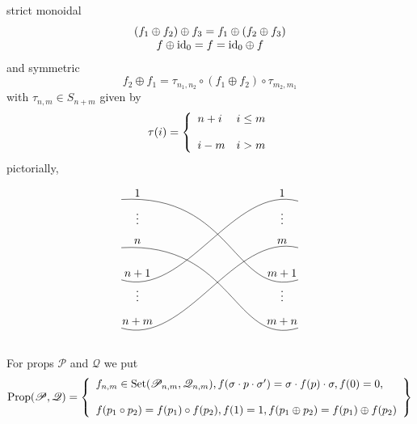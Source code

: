 \documentclass[leqno]{article}
\newcommand{\biop}{\mathscr{P}}
\DeclareMathOperator{\prop}{Prop}
\numberwithin{equation}{section}
\begin{document}
strict monoidal 
\begin{equation}
				\begin{array}[H]{c}
				(f_1\oplus f_2)\oplus f_3 = f_1\oplus (f_2\oplus f_3) \\
				f\oplus \text{id}_0=f = \text{id}_0\oplus f
				\end{array}
				\label{eq:10.7}
\end{equation}
and symmetric 
\begin{equation}
				f_2\oplus f_1 = \tau_{n_1,n_2}\circ (f_1\oplus f_2)\circ \tau_{m_2,m_1}
				\label{eq:10.8}
\end{equation}
with $\tau_{n,m}\in S_{n+m}$ given by
\begin{equation}
				\tau(i)=\left\{ 
								\begin{array}[H]{lc}
												n+i & i\le m \\\\
												i-m & i>m
								\end{array}
				\right.
				\label{eq:10.9}
\end{equation}
pictorially, 
\begin{equation}
				\begin{aligned}
\begin{tikzpicture}[baseline=0mm]
				\node at (5mm,5mm) {$n+m$};
				\node at (5mm,20mm) {$n+1$};
				\node at (5mm,30mm) {$n$};
				\node at (5mm,45mm) {$1$};
				\node at (5mm,38mm) {$\vdots$};
				\node at (5mm,14mm) {$\vdots$};

				\node at (50mm,5mm) {$m+n$};
				\node at (50mm,20mm) {$m+1$};
				\node at (50mm,30mm) {$m$};
				\node at (50mm,45mm) {$1$};
				\node at (50mm,38mm) {$\vdots$};
				\node at (50mm,14mm) {$\vdots$};

				\draw (0mm,43mm).. controls (35mm,45mm) and (35mm,12mm) .. (55mm,18mm);
				\draw (0mm,28mm).. controls (35mm,30mm) and (35mm,-3mm) .. (55mm,3mm);
				\draw (0mm,3mm).. controls (20mm,-3mm) and (35mm,33mm) .. (55mm,28mm);
				\draw (0mm,18mm).. controls (20mm,12mm) and (35mm,48mm) .. (55mm,42.5mm);
\end{tikzpicture}
				\end{aligned}
				\label{eq:10.10}
\end{equation}
For props $\biop$ and $\mathscr{Q}$ we put 
\begin{equation}
        \prop(\biop,\mathscr{Q})= 
	\left\{ 
		\begin{array}[H]{l}
                	f_{n,m}\in \text{Set}(\biop_{n,m},\mathscr{Q}_{n,m}),  f(\sigma\cdot p
			\cdot \sigma^{\prime})= \sigma\cdot f(p)\cdot \sigma, f(0)=0, \\\\
			f(p_{1}\circ p_{2}) = f(p_{1})\circ f(p_{2}), f(1)=1, f(p_1\oplus
			p_2) = f(p_1)\oplus f(p_2)
		\end{array}
	\right\}
	\label{eq:10.11}
\end{equation}
\end{document}

